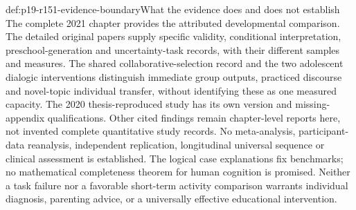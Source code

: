 \begin{proofboundary}{def:p19-r151-evidence-boundary}{What the evidence does and does not establish}
The complete 2021 chapter provides the attributed developmental comparison.
The detailed original papers supply specific validity, conditional
interpretation, preschool-generation and uncertainty-task records, with their
different samples and measures. The shared collaborative-selection record
and the two adolescent dialogic interventions distinguish immediate group
outputs, practiced discourse and novel-topic individual transfer, without
identifying these as one measured capacity. The 2020 thesis-reproduced study has its own
version and missing-appendix qualifications. Other cited findings remain chapter-level reports here, not
invented complete quantitative study records. No meta-analysis, participant-data
reanalysis, independent replication, longitudinal universal sequence or clinical
assessment is established. The logical case explanations fix benchmarks; no
mathematical completeness theorem for human cognition is promised. Neither a
task failure nor a favorable short-term activity comparison warrants individual
diagnosis, parenting advice, or a universally effective educational intervention.
\end{proofboundary}
